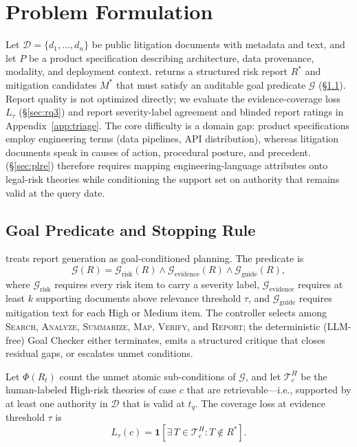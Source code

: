 \section{Problem Formulation}
\label{sec:problem}

Let $\mathcal{D} = \{d_1, \ldots, d_n\}$ be public litigation documents with metadata and text, and let $P$ be a product specification describing architecture, data provenance, modality, and deployment context.
\sysname{} returns a structured risk report $R^*$ and mitigation candidates $M^*$ that must satisfy an auditable goal predicate $\mathcal{G}$ (\S\ref{sec:goal}).
Report quality is not optimized directly; we evaluate the evidence-coverage loss $L_\tau$ (\S\ref{sec:rq3}) and report severity-label agreement and blinded report ratings in Appendix~\ref{app:triage}.
The core difficulty is a domain gap: product specifications employ engineering terms (data pipelines, API distribution), whereas litigation documents speak in causes of action, procedural posture, and precedent.
\plre{} (\S\ref{sec:plre}) therefore requires mapping engineering-language attributes onto legal-risk theories while conditioning the support set on authority that remains valid at the query date.

\subsection{Goal Predicate and Stopping Rule}
\label{sec:goal}

\sysname{} treats report generation as goal-conditioned planning.
The predicate is
\begin{equation}
\mathcal{G}(R) = \mathcal{G}_{\mathrm{risk}}(R) \land \mathcal{G}_{\mathrm{evidence}}(R) \land \mathcal{G}_{\mathrm{guide}}(R),
\end{equation}
where $\mathcal{G}_{\mathrm{risk}}$ requires every risk item to carry a severity label, $\mathcal{G}_{\mathrm{evidence}}$ requires at least $k$ supporting documents above relevance threshold $\tau$, and $\mathcal{G}_{\mathrm{guide}}$ requires mitigation text for each High or Medium item.
The controller selects among \textsc{Search}, \textsc{Analyze}, \textsc{Summarize}, \textsc{Map}, \textsc{Verify}, and \textsc{Report}; the deterministic (LLM-free) Goal Checker either terminates, emits a structured critique that closes residual gaps, or escalates unmet conditions.

Let $\Phi(R_t)$ count the unmet atomic sub-conditions of $\mathcal{G}$, and let $\mathcal{T}_c^H$ be the human-labeled High-risk theories of case $c$ that are retrievable---i.e., supported by at least one authority in $\mathcal{D}$ that is valid at $t_q$.
The coverage loss at evidence threshold $\tau$ is
\begin{equation}
L_\tau(c) = \mathbf{1}\!\left[\exists\, T \in \mathcal{T}_c^H : T \notin R^*\right].
\end{equation}

